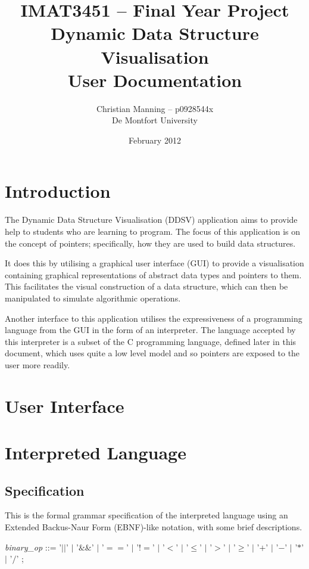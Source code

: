 \documentclass{article}
\author{Christian Manning -- p0928544x\\
De Montfort University}
\title{IMAT3451 -- Final Year Project\\
    Dynamic Data Structure Visualisation\\
    User Documentation
}
\date{February 2012}
\begin{document}
\maketitle

\tableofcontents

\pagebreak

\section{Introduction}

The Dynamic Data Structure Visualisation (DDSV) application aims to provide help to students who are learning to program. The focus of this application is on the concept of pointers; specifically, how they are used to build data structures.

It does this by utilising a graphical user interface (GUI) to provide a visualisation containing graphical representations of abstract data types and pointers to them. This facilitates the visual construction of a data structure, which can then be manipulated to simulate algorithmic operations.

Another interface to this application utilises the expressiveness of a programming language from the GUI in the form of an interpreter. The language accepted by this interpreter is a subset of the C programming language, defined later in this document, which uses quite a low level model and so pointers are exposed to the user more readily.

\section{User Interface}

\section{Interpreted Language}

\subsection{Specification}

This is the formal grammar specification of the interpreted language using an Extended Backus-Naur Form (EBNF)-like notation, with some brief descriptions.

\noindent\textit{binary\_op} ::=
    '$||$'
    $|$ '$\&\&$'
    $|$ '$==$'
    $|$ '$!=$'
    $|$ '$<$'
    $|$ '$\leq$'
    $|$ '$>$'
    $|$ '$\geq$'
    $|$ '$+$'
    $|$ '$-$'
    $|$ '$*$'
    $|$ '$/$'
    ;
\end{document}
